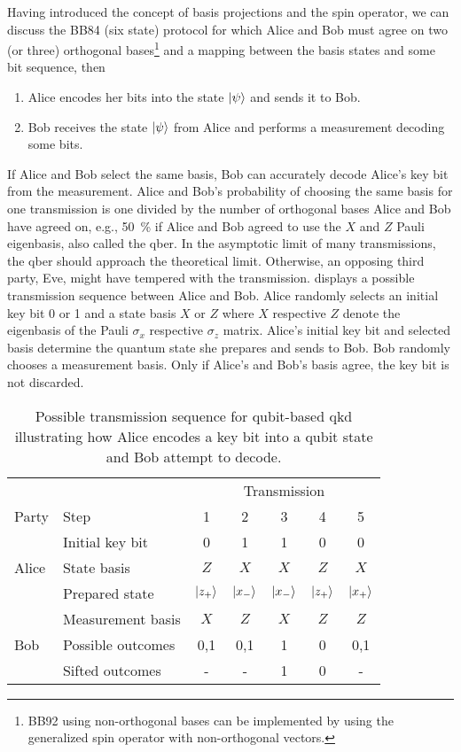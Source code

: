 Having introduced the concept of basis projections and the spin operator, we can discuss the BB84 (six state) protocol for which Alice and Bob must agree on two (or three) orthogonal bases\footnote{BB92 using non-orthogonal bases can be implemented by using the generalized spin operator with non-orthogonal vectors.} and a mapping between the basis states and some bit sequence, then
\begin{enumerate}
	\item Alice encodes her bits into the state $\lvert\psi\rangle$ and sends it to Bob.
	\item Bob receives the state $\lvert\psi\rangle$ from Alice and performs a measurement decoding some bits.
\end{enumerate}
If Alice and Bob select the same basis, Bob can accurately decode Alice's key bit from the measurement.
Alice and Bob's probability of choosing the same basis for one transmission is one divided by the number of orthogonal bases Alice and Bob have agreed on, e.g., \SI{50}{\percent} if Alice and Bob agreed to use the $X$ and $Z$ Pauli eigenbasis, also called the \gls{qber}.
In the asymptotic limit of many transmissions, the \gls{qber} should approach the theoretical limit.
Otherwise, an opposing third party, Eve, might have tempered with the transmission.
 displays a possible transmission sequence between Alice and Bob.
Alice randomly selects an initial key bit \num{0} or \num{1} and a state basis $X$ or $Z$ where $X$ respective $Z$ denote the eigenbasis of the Pauli $\sigma_x$ respective $\sigma_z$ matrix. Alice's initial key bit and selected basis determine the quantum state she prepares and sends to Bob. Bob randomly chooses a measurement basis. Only if Alice's and Bob's basis agree, the key bit is not discarded.
\begin{table}[htb]
	\centering
	\begin{tabular}{llccccc}
		\toprule
		& & \multicolumn{5}{c}{Transmission} \\
		\cmidrule{3-7}
		Party & Step & 1 & 2 & 3 & 4 & 5 \\ 
		\midrule
		\multirow{3}{*}{Alice} & Initial key bit & \num{0} & \num{1} & \num{1} & \num{0} & \num{0} \\
		& State basis & $Z$ & $X$ & $X$ & $Z$ & $X$ \\
		& Prepared state & $\lvert z_+\rangle$ & $\lvert x_-\rangle$ & $\lvert x_-\rangle$ & $\lvert z_+\rangle$ & $\lvert x_+\rangle$ \\
		\cmidrule{1-1}
		\multirow{3}{*}{Bob} & Measurement basis & $X$ & $Z$ & $X$ & $Z$ & $Z$ \\
		& Possible outcomes & \num{0},\num{1} & \num{0},\num{1} & \num{1} & \num{0} & \num{0},\num{1} \\
		& Sifted outcomes & - & - & 1 & 0 & - \\
		\bottomrule
	\end{tabular}
	\caption{Possible transmission sequence for qubit-based \gls{qkd} illustrating how Alice encodes a key bit into a qubit state and Bob attempt to decode.}\label{tab:qubit_transmission_sequence}
\end{table}
